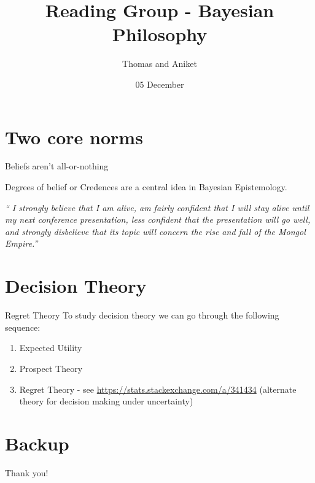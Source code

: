 \documentclass[usenames,dvipsnames]{beamer}
\title[Seminar]{Reading Group - Bayesian Philosophy}
\author[TCAJ]{Thomas and Aniket}
\institute[U-M]{University of Michigan}
\date{05 December}
\theoremstyle{definition}
\begin{document}
\begin{frame}[plain]
\titlepage %
\end{frame}

\section{Two core norms}

\begin{frame}{Beliefs aren't all-or-nothing}

Degrees of belief or Credences are a central idea in Bayesian Epistemology.

\emph{`` I strongly believe that I am alive, am fairly confident that I will stay alive until my next conference presentation, less confident that the presentation will go well, and strongly disbelieve that its topic will concern the rise and fall of the Mongol Empire.''}
    
\end{frame}


\section{Decision Theory}
\begin{frame}{Regret Theory}
To study decision theory we can go through the following sequence:

\begin{enumerate}
  \item Expected Utility 
  \item Prospect Theory
  \item Regret Theory - see \url{https://stats.stackexchange.com/a/341434} (alternate theory for decision making under uncertainty)
\end{enumerate}
\end{frame}




%     

%     

\section{Backup}
\begin{frame}{}
\begin{center}
    \Large{Thank you!}
\end{center}
        
\end{frame}
\end{document}

